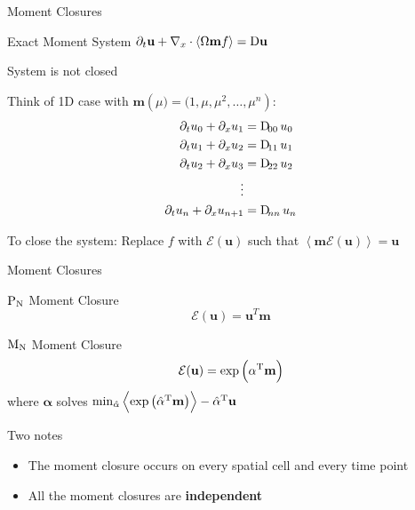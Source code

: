 \documentclass{beamer}
\renewcommand{\vec}[1]{\ensuremath{\mathbf{#1}}}
\newcommand{\integral}[1]{\ensuremath{\left\langle #1 \right\rangle}}
\newcommand{\closure}[1]{\ensuremath{\mathcal{E}(#1)}}
\newcommand{\T}[1]{\ensuremath{#1^\textnormal{T}}}
\newcommand{\PN}{\ensuremath{\textnormal{P}_\textnormal{N}}\xspace}
\newcommand{\MN}{\ensuremath{\textnormal{M}_\textnormal{N}}\xspace}
\begin{document}
    \begin{frame}{Moment Closures}
        \begin{block}{Exact Moment System}
            $\partial_t \vec{u} + \nabla_x \cdot \integral{\Omega \vec{m} f} = \Dif \vec{u}$
        \end{block}

        \vfill

        System is not closed

        Think of 1D case with $\vec{m}\left(\mu) = (1, \mu, \mu^2, \dots, \mu^n\right)$:
        \begin{align*}
            \partial_t u_0 + \partial_x u_1 &= \Dif_{00} u_0 \\
            \partial_t u_1 + \partial_x u_2 &= \Dif_{11} u_1 \\
            \partial_t u_2 + \partial_x u_3 &= \Dif_{22} u_2 \\
            \vdots \\
            \partial_t u_n + \partial_x u_{n + 1} &= \Dif_{nn} u_n
        \end{align*}

        \vfill

        \alert{To close the system}: Replace $f$ with $\closure{\vec{u}}$ such that $\integral{\vec{m} \closure{\vec{u}}} = \vec{u}$
    \end{frame}

    \begin{frame}{Moment Closures}
        \begin{block}{\PN Moment Closure}
            \[ \closure{\vec{u}} = \vec{u}^T \vec{m} \]
        \end{block}
        \begin{block}{\MN Moment Closure}
            \[ \closure{\vec{u}} = \exp\left(\T{\vec{\alpha}} \vec{m}\right) \]
            where \vec{\alpha} solves $\min_{\hat{\alpha}} \integral{\exp\left(\T{\hat{\vec{\alpha}}} \vec{m}\right)} - \T{\hat{\vec{\alpha}}} \vec{u}$
        \end{block}

        \vfill

        \alert{Two notes}
        \begin{itemize}
            \item The moment closure occurs on every spatial cell and every time point
            \item All the moment closures are \textbf{independent}
        \end{itemize}
    \end{frame}
\end{document}
